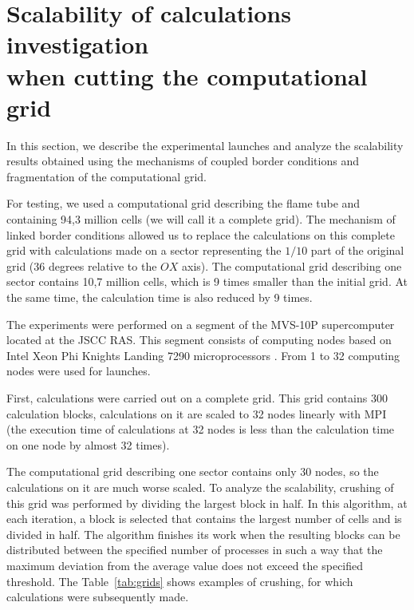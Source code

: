 \documentclass[
11pt,%
tightenlines,%
twoside,%
onecolumn,%
nofloats,%
nobibnotes,%
nofootinbib,%
superscriptaddress,%
noshowpacs,%
centertags]%
{revtex4}
\begin{document}
\section{Scalability of calculations investigation \protect\\ when cutting the computational grid}

In this section, we describe the experimental launches and analyze the scalability results obtained using the mechanisms of coupled border conditions and fragmentation of the computational grid.

For testing, we used a computational grid describing the flame tube and containing 94,3 million cells (we will call it a complete grid).
The mechanism of linked border conditions allowed us to replace the calculations on this complete grid with calculations made on a sector representing the $1/10$ part of the original grid (36 degrees relative to the $OX$ axis).
The computational grid describing one sector contains 10,7 million cells, which is 9 times smaller than the initial grid.
At the same time, the calculation time is also reduced by 9 times.

The experiments were performed on a segment of the MVS-10P supercomputer located at the JSCC RAS.
This segment consists of computing nodes based on Intel Xeon Phi Knights Landing 7290 microprocessors \cite{Jeffers_KNL}.
From 1 to 32 computing nodes were used for launches.

First, calculations were carried out on a complete grid.
This grid contains 300 calculation blocks, calculations on it are scaled to 32 nodes linearly with MPI \cite{Queen} (the execution time of calculations at 32 nodes is less than the calculation time on one node by almost 32 times).

The computational grid describing one sector contains only 30 nodes, so the calculations on it are much worse scaled.
To analyze the scalability, crushing of this grid was performed by dividing the largest block in half.
In this algorithm, at each iteration, a block is selected that contains the largest number of cells and is divided in half.
The algorithm finishes its work when the resulting blocks can be distributed between the specified number of processes in such a way that the maximum deviation from the average value does not exceed the specified threshold.
The Table~\ref{tab:grids} shows examples of crushing, for which calculations were subsequently made.
\end{document}
